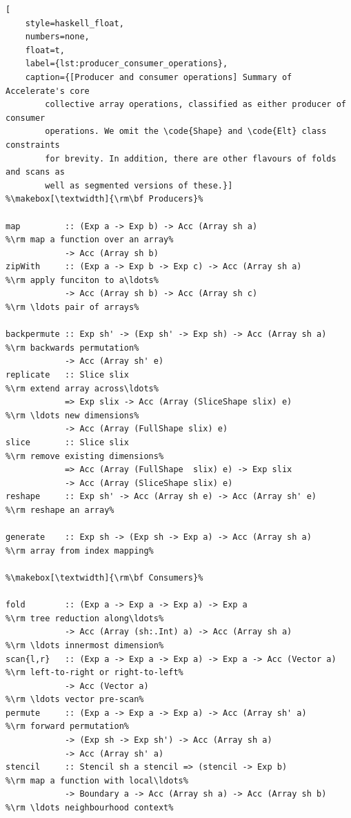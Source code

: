 \begin{lstlisting}[
    style=haskell_float,
    numbers=none,
    float=t,
    label={lst:producer_consumer_operations},
    caption={[Producer and consumer operations] Summary of Accelerate's core
        collective array operations, classified as either producer of consumer
        operations. We omit the \code{Shape} and \code{Elt} class constraints
        for brevity. In addition, there are other flavours of folds and scans as
        well as segmented versions of these.}]
%\makebox[\textwidth]{\rm\bf Producers}%

map         :: (Exp a -> Exp b) -> Acc (Array sh a)                   %\rm map a function over an array%
            -> Acc (Array sh b)
zipWith     :: (Exp a -> Exp b -> Exp c) -> Acc (Array sh a)          %\rm apply funciton to a\ldots%
            -> Acc (Array sh b) -> Acc (Array sh c)                   %\rm \ldots pair of arrays%

backpermute :: Exp sh' -> (Exp sh' -> Exp sh) -> Acc (Array sh a)     %\rm backwards permutation%
            -> Acc (Array sh' e)
replicate   :: Slice slix                                             %\rm extend array across\ldots%
            => Exp slix -> Acc (Array (SliceShape slix) e)            %\rm \ldots new dimensions%
            -> Acc (Array (FullShape slix) e)
slice       :: Slice slix                                             %\rm remove existing dimensions%
            => Acc (Array (FullShape  slix) e) -> Exp slix
            -> Acc (Array (SliceShape slix) e)
reshape     :: Exp sh' -> Acc (Array sh e) -> Acc (Array sh' e)       %\rm reshape an array%

generate    :: Exp sh -> (Exp sh -> Exp a) -> Acc (Array sh a)        %\rm array from index mapping%

%\makebox[\textwidth]{\rm\bf Consumers}%

fold        :: (Exp a -> Exp a -> Exp a) -> Exp a                     %\rm tree reduction along\ldots%
            -> Acc (Array (sh:.Int) a) -> Acc (Array sh a)            %\rm \ldots innermost dimension%
scan{l,r}   :: (Exp a -> Exp a -> Exp a) -> Exp a -> Acc (Vector a)   %\rm left-to-right or right-to-left%
            -> Acc (Vector a)                                         %\rm \ldots vector pre-scan%
permute     :: (Exp a -> Exp a -> Exp a) -> Acc (Array sh' a)         %\rm forward permutation%
            -> (Exp sh -> Exp sh') -> Acc (Array sh a)
            -> Acc (Array sh' a)
stencil     :: Stencil sh a stencil => (stencil -> Exp b)             %\rm map a function with local\ldots%
            -> Boundary a -> Acc (Array sh a) -> Acc (Array sh b)     %\rm \ldots neighbourhood context%
\end{lstlisting}

